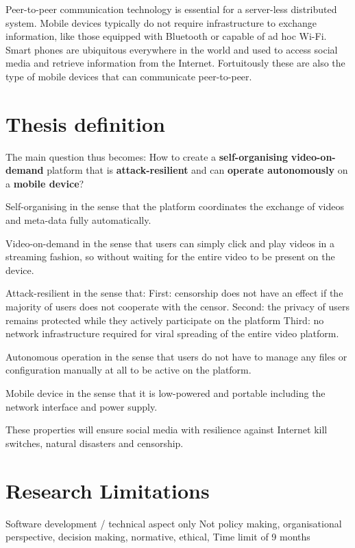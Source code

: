 Peer-to-peer communication technology is essential for a server-less distributed system.
Mobile devices typically do not require infrastructure to exchange information, like those equipped with Bluetooth or capable of ad hoc Wi-Fi.
Smart phones are ubiquitous everywhere in the world and used to access social media and retrieve information from the Internet.
Fortuitously these are also the type of mobile devices that can communicate peer-to-peer.

\section{Thesis definition}
The main question thus becomes:
How to create a \textbf{self-organising} \textbf{video-on-demand} platform that is \textbf{attack-resilient} and can \textbf{operate autonomously} on a \textbf{mobile device}?

Self-organising in the sense that the platform coordinates the exchange of videos and meta-data fully automatically.

Video-on-demand in the sense that users can simply click and play videos in a streaming fashion, so without waiting for the entire video to be present on the device.

Attack-resilient in the sense that:
First: censorship does not have an effect if the majority of users does not cooperate with the censor.
Second: the privacy of users remains protected while they actively participate on the platform
Third: no network infrastructure required for viral spreading of the entire video platform.

Autonomous operation in the sense that users do not have to manage any files or configuration manually at all to be active on the platform.

Mobile device in the sense that it is low-powered and portable including the network interface and power supply.

These properties will ensure social media with resilience against Internet kill switches, natural disasters and censorship.



\section{Research Limitations} %
Software development / technical aspect only
Not policy making, organisational perspective, decision making, normative, ethical,
Time limit of 9 months





